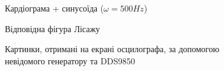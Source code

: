 \begin{figure}[h]
\begin{minipage}[h]{0.47\linewidth}
	\end{minipage}
	\vfill
	\begin{minipage}[h]{0.47\linewidth}
		 Кардіограма + синусоїда ($\omega = 500Hz$)\\
	\end{minipage}
	\hfill
	\begin{minipage}[h]{0.47\linewidth}
		 Відповідна фігура Лісажу \\
	\end{minipage}
	\caption{Картинки, отримані на екрані осцилографа, за допомогою невідомого генератору та DDS9850}
	\label{fig:part22}
\end{figure}

